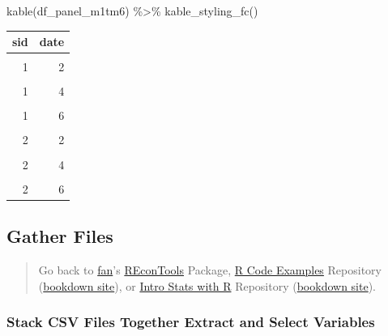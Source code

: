 \documentclass[
]{book}
\newenvironment{Shaded}{\begin{snugshade}}{\end{snugshade}}
\newcommand{\FunctionTok}[1]{\textcolor[rgb]{0.00,0.00,0.00}{#1}}
\newcommand{\NormalTok}[1]{#1}
\newcommand{\SpecialCharTok}[1]{\textcolor[rgb]{0.00,0.00,0.00}{#1}}
\begin{document}
\begin{Shaded}
\begin{Highlighting}[]
\FunctionTok{kable}\NormalTok{(df\_panel\_m1tm6) }\SpecialCharTok{\%\textgreater{}\%}
  \FunctionTok{kable\_styling\_fc}\NormalTok{()}
\end{Highlighting}
\end{Shaded}

\begin{table}[!h]
\centering
\begin{tabular}{r|r}
\hline
sid & date\\
\hline
\cellcolor{gray!6}{1} & \cellcolor{gray!6}{1}\\
\hline
1 & 2\\
\hline
\cellcolor{gray!6}{1} & \cellcolor{gray!6}{3}\\
\hline
1 & 4\\
\hline
\cellcolor{gray!6}{1} & \cellcolor{gray!6}{5}\\
\hline
1 & 6\\
\hline
\cellcolor{gray!6}{2} & \cellcolor{gray!6}{1}\\
\hline
2 & 2\\
\hline
\cellcolor{gray!6}{2} & \cellcolor{gray!6}{3}\\
\hline
2 & 4\\
\hline
\cellcolor{gray!6}{2} & \cellcolor{gray!6}{5}\\
\hline
2 & 6\\
\hline
\end{tabular}
\end{table}

\hypertarget{gather-files}{%
\subsection{Gather Files}\label{gather-files}}

\begin{quote}
Go back to \href{http://fanwangecon.github.io/}{fan}'s \href{https://fanwangecon.github.io/REconTools/}{REconTools} Package, \href{https://fanwangecon.github.io/R4Econ/}{R Code Examples} Repository (\href{https://fanwangecon.github.io/R4Econ/bookdown}{bookdown site}), or \href{https://fanwangecon.github.io/Stat4Econ/}{Intro Stats with R} Repository (\href{https://fanwangecon.github.io/Stat4Econ/bookdown}{bookdown site}).
\end{quote}

\hypertarget{stack-csv-files-together-extract-and-select-variables}{%
\subsubsection{Stack CSV Files Together Extract and Select Variables}\label{stack-csv-files-together-extract-and-select-variables}}
\end{document}
